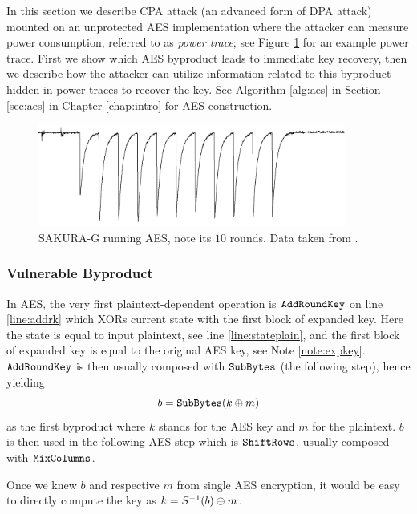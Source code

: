 In this section we describe CPA attack (an advanced form of DPA attack) mounted on an unprotected AES implementation where the attacker can measure power consumption, referred to as {\em power trace}; see Figure \ref{fig:powertrace} for an example power trace. First we show which AES byproduct leads to immediate key recovery, then we describe how the attacker can utilize information related to this byproduct hidden in power traces to recover the key. See Algorithm \ref{alg:aes} in Section \ref{sec:aes} in Chapter \ref{chap:intro} for AES construction.

\begin{figure}[h]
\begin{center}
	\includegraphics[width=0.9\textwidth]{./figures/power_trace/power_trace.png}
	\caption{SAKURA-G running AES, note its $10$ rounds. Data taken from \cite{exampletraces}.}
	\label{fig:powertrace}
\end{center}
\end{figure}

\subsubsection{Vulnerable Byproduct}

In AES, the very first plaintext-dependent operation is $\texttt{AddRoundKey}$ on line \ref{line:addrk} which XORs current state with the first block of expanded key. Here the state is equal to input plaintext, see line \ref{line:stateplain}, and the first block of expanded key is equal to the original AES key, see Note \ref{note:expkey}. $\texttt{AddRoundKey}$ is then usually composed with $\texttt{SubBytes}$ (the following step), hence yielding
\begin{equation}
	b = \texttt{SubBytes}(k\oplus m) \label{eq:byprod}
\end{equation}
as the first byproduct where $k$ stands for the AES key and $m$ for the plaintext. $b$ is then used in the following AES step which is $\texttt{ShiftRows}$, usually composed with $\texttt{MixColumns}$.

Once we knew $b$ and respective $m$ from single AES encryption, it would be easy to directly compute the key as $k = S^{-1}(b)\oplus m$.

